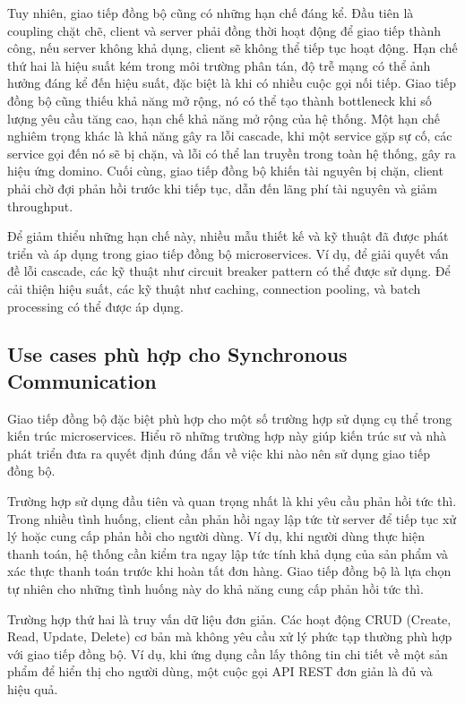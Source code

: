 Tuy nhiên, giao tiếp đồng bộ cũng có những hạn chế đáng kể. Đầu tiên là coupling chặt chẽ, client và server phải đồng thời hoạt động để giao tiếp thành công, nếu server không khả dụng, client sẽ không thể tiếp tục hoạt động. Hạn chế thứ hai là hiệu suất kém trong môi trường phân tán, độ trễ mạng có thể ảnh hưởng đáng kể đến hiệu suất, đặc biệt là khi có nhiều cuộc gọi nối tiếp. Giao tiếp đồng bộ cũng thiếu khả năng mở rộng, nó có thể tạo thành bottleneck khi số lượng yêu cầu tăng cao, hạn chế khả năng mở rộng của hệ thống. Một hạn chế nghiêm trọng khác là khả năng gây ra lỗi cascade, khi một service gặp sự cố, các service gọi đến nó sẽ bị chặn, và lỗi có thể lan truyền trong toàn hệ thống, gây ra hiệu ứng domino. Cuối cùng, giao tiếp đồng bộ khiến tài nguyên bị chặn, client phải chờ đợi phản hồi trước khi tiếp tục, dẫn đến lãng phí tài nguyên và giảm throughput.

Để giảm thiểu những hạn chế này, nhiều mẫu thiết kế và kỹ thuật đã được phát triển và áp dụng trong giao tiếp đồng bộ microservices. Ví dụ, để giải quyết vấn đề lỗi cascade, các kỹ thuật như circuit breaker pattern có thể được sử dụng. Để cải thiện hiệu suất, các kỹ thuật như caching, connection pooling, và batch processing có thể được áp dụng.

\subsection{Use cases phù hợp cho Synchronous Communication}
Giao tiếp đồng bộ đặc biệt phù hợp cho một số trường hợp sử dụng cụ thể trong kiến trúc microservices. Hiểu rõ những trường hợp này giúp kiến trúc sư và nhà phát triển đưa ra quyết định đúng đắn về việc khi nào nên sử dụng giao tiếp đồng bộ.

Trường hợp sử dụng đầu tiên và quan trọng nhất là khi yêu cầu phản hồi tức thì. Trong nhiều tình huống, client cần phản hồi ngay lập tức từ server để tiếp tục xử lý hoặc cung cấp phản hồi cho người dùng. Ví dụ, khi người dùng thực hiện thanh toán, hệ thống cần kiểm tra ngay lập tức tính khả dụng của sản phẩm và xác thực thanh toán trước khi hoàn tất đơn hàng. Giao tiếp đồng bộ là lựa chọn tự nhiên cho những tình huống này do khả năng cung cấp phản hồi tức thì.

Trường hợp thứ hai là truy vấn dữ liệu đơn giản. Các hoạt động CRUD (Create, Read, Update, Delete) cơ bản mà không yêu cầu xử lý phức tạp thường phù hợp với giao tiếp đồng bộ. Ví dụ, khi ứng dụng cần lấy thông tin chi tiết về một sản phẩm để hiển thị cho người dùng, một cuộc gọi API REST đơn giản là đủ và hiệu quả.

